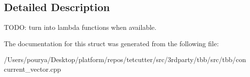 \subsection{Detailed Description}
T\+O\+D\+O\+: turn into lambda functions when available. 

The documentation for this struct was generated from the following file\+:\begin{DoxyCompactItemize}
\item 
/\+Users/pourya/\+Desktop/platform/repos/tetcutter/src/3rdparty/tbb/src/tbb/concurrent\+\_\+vector.\+cpp\end{DoxyCompactItemize}
